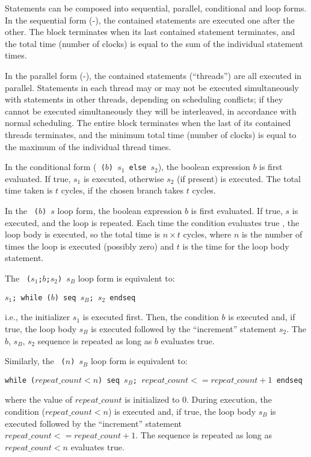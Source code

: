 Statements can be composed into sequential, parallel, conditional and
loop forms.  In the sequential form (-), the
contained statements are executed one after the other. The
 block terminates when its last contained statement
terminates, and the total time (number of clocks) is equal to the sum
of the individual statement times.

In the parallel form (-), the contained statements
(``threads'') are all executed in parallel.  Statements in each thread may or
may not be executed simultaneously with statements in other threads, depending
on scheduling conflicts; if they cannot be executed simultaneously they will
be interleaved, in accordance with normal scheduling.  The entire {}
block terminates when the last of its contained threads terminates, and the
minimum total time (number of clocks) is equal to the maximum of the
individual thread times.

In the conditional form (\texttt{ ($b$) $s_1$ else $s_2$}), the
boolean expression $b$ is first evaluated.  If true, $s_1$ is
executed, otherwise $s_2$ (if present) is executed.  The total time
taken is $t$ cycles, if the chosen branch takes $t$ cycles.

In the \texttt{ ($b$) $s$} loop form, the boolean
expression $b$ is first evaluated.  If true, $s$ is executed, and the
loop is repeated.  Each time the condition evaluates true , the loop
body is executed, so the total time is $n \times t$ cycles, where $n$
is the number of times the loop is executed (possibly zero) and $t$ is
the time for the loop body statement.

The \texttt{ ($s_1$;$b$;$s_2$) $s_B$} loop form is equivalent
to:
\begin{tabbing}
\hm \texttt{$s_1$; while ($b$) seq $s_B$; $s_2$ endseq}
\end{tabbing}
i.e., the initializer $s_1$ is executed first.  Then, the condition
$b$ is executed and, if true, the loop body $s_B$ is executed followed
by the ``increment'' statement $s_2$.  The $b$, $s_B$, $s_2$ sequence
is repeated as long as $b$ evaluates true.

Similarly, the \texttt{ ($n$) $s_B$} loop form is equivalent
to:
\begin{tabbing}
\hm \texttt{while ($repeat\_count < n$) seq $s_B$; $repeat\_count <= repeat\_count + 1$ endseq}
\end{tabbing}
where the value of $repeat\_count$ is initialized to $0$.  During
execution, the condition ($repeat\_count < n$) is executed and, if true, the loop body
$s_B$ is executed followed by the ``increment'' statement $repeat\_count <= repeat\_count + 1$.
The sequence is repeated as long as $repeat\_count < n$ evaluates true.

